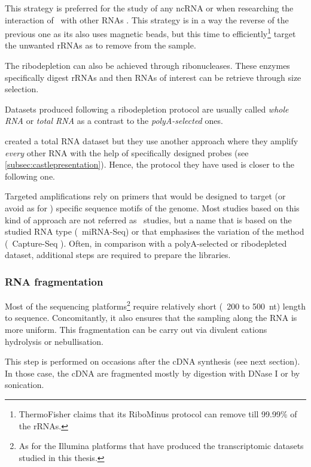 This strategy is preferred for the study of any \gls{ncRNA} or when researching
the interaction of \mRNAs\ with other \glspl{RNA} . This
strategy is in a way the reverse of the previous one as its also
uses magnetic beads, but this time to efficiently\footnote{ThermoFisher claims
that its RiboMinus protocol can remove till 99.99\% of the \glspl{rRNA}.}
target the unwanted \glspl{rRNA} as to remove from the sample.

The ribodepletion can also be achieved through ribonucleases. These enzymes
specifically digest \glspl{rRNA} and then \glspl{RNA} of interest can be retrieve
through size selection.

Datasets produced following a ribodepletion protocol are usually called
\emph{whole \gls{RNA}} or \emph{total \gls{RNA}} as a contrast to the
\emph{polyA-selected} ones.

\cite{castleData} created a total \gls{RNA} dataset but they use another
approach where they amplify \emph{every} other \gls{RNA} with the help of
specifically designed probes (see \cref{subsec:castlepresentation}). Hence,
the protocol they have used is closer to the following one.

Targeted amplifications rely on primers that would be designed to target (or
avoid as for \cite{castleData}) specific sequence motifs of the genome. Most
studies based on this kind of approach are not referred as \Rnaseq\ studies, but
a name that is based on the studied \gls{RNA} type (\eg\ \gls{miRNA-Seq}) or
that emphasises the variation of the method (\eg\ Capture-Seq
). Often, in comparison with a polyA-selected or ribodepleted
dataset, additional steps are required to prepare the libraries.


\subsubsection{RNA fragmentation}

Most of the sequencing platforms\footnote{As for the Illumina platforms that have
produced the transcriptomic datasets studied in this thesis.} require relatively
short (\ie\ 200 to 500\ nt) length to sequence. Concomitantly, it also ensures
that the sampling along the \gls{RNA} is more uniform.
This fragmentation can be carry out via divalent cations hydrolysis or
nebullisation.

This step is performed on occasions after the \gls{cDNA} synthesis
(see next section). In those case, the \gls{cDNA} are fragmented mostly
by digestion with DNase I or by sonication.

